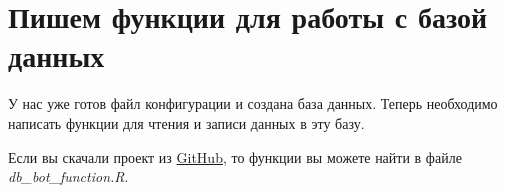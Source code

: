 \documentclass[
]{book}
\begin{document}
\hypertarget{ux43fux438ux448ux435ux43c-ux444ux443ux43dux43aux446ux438ux438-ux434ux43bux44f-ux440ux430ux431ux43eux442ux44b-ux441-ux431ux430ux437ux43eux439-ux434ux430ux43dux43dux44bux445}{%
\section{Пишем функции для работы с базой данных}\label{ux43fux438ux448ux435ux43c-ux444ux443ux43dux43aux446ux438ux438-ux434ux43bux44f-ux440ux430ux431ux43eux442ux44b-ux441-ux431ux430ux437ux43eux439-ux434ux430ux43dux43dux44bux445}}

У нас уже готов файл конфигурации и создана база данных. Теперь необходимо написать функции для чтения и записи данных в эту базу.

Если вы скачали проект из \href{https://github.com/selesnow/logical_tg_bot/archive/master.zip}{GitHub}, то функции вы можете найти в файле \emph{db\_bot\_function.R}.
\end{document}
